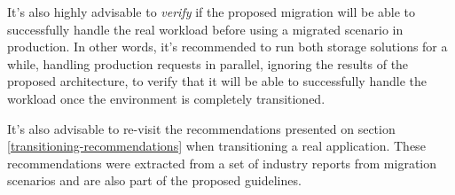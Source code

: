 It's also highly advisable to \textit{verify} if the proposed migration will be able to successfully handle the real workload before using a migrated scenario in production. In other words, it's recommended to run both storage solutions for a while, handling production requests in parallel, ignoring the results of the proposed architecture, to verify that it will be able to successfully handle the workload once the environment is completely transitioned.

It's also advisable to re-visit the recommendations presented on section \ref{transitioning-recommendations} when transitioning a real application. These recommendations were extracted from a set of industry reports from migration scenarios and are also part of the proposed guidelines.
